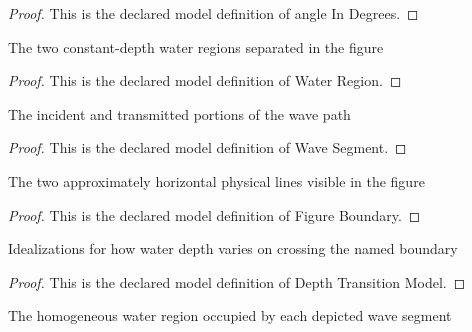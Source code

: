 \begin{proof}
  This is the declared model definition of angle In Degrees.
\end{proof}
\begin{definition}
  \label{def:physics:phyx-mini-0174:phyxminiproblems-problemphyxmini0174-waterregion}
  The two constant-depth water regions separated in the figure
\end{definition}
\begin{proof}
  This is the declared model definition of Water Region.
\end{proof}
\begin{definition}
  \label{def:physics:phyx-mini-0174:phyxminiproblems-problemphyxmini0174-wavesegment}
  The incident and transmitted portions of the wave path
\end{definition}
\begin{proof}
  This is the declared model definition of Wave Segment.
\end{proof}
\begin{definition}
  \label{def:physics:phyx-mini-0174:phyxminiproblems-problemphyxmini0174-figureboundary}
  The two approximately horizontal physical lines visible in the figure
\end{definition}
\begin{proof}
  This is the declared model definition of Figure Boundary.
\end{proof}
\begin{definition}
  \label{def:physics:phyx-mini-0174:phyxminiproblems-problemphyxmini0174-depthtransitionmodel}
  Idealizations for how water depth varies on crossing the named boundary
\end{definition}
\begin{proof}
  This is the declared model definition of Depth Transition Model.
\end{proof}
\begin{definition}[region]
  \label{def:physics:phyx-mini-0174:phyxminiproblems-problemphyxmini0174-wavesegment-region}
  The homogeneous water region occupied by each depicted wave segment
\end{definition}
